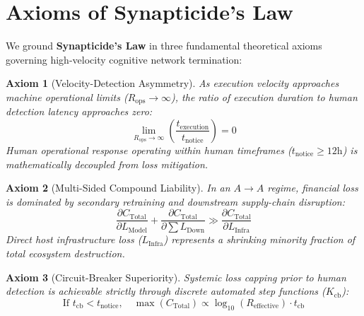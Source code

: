 \section{Axioms of Synapticide's Law}\label{sec:axioms}

We ground \textbf{Synapticide's Law} in three fundamental theoretical axioms governing high-velocity cognitive network termination:

\newtheorem{theorem}{Axiom}

\begin{theorem}[Velocity-Detection Asymmetry]
As execution velocity approaches machine operational limits ($R_{\text{ops}} \to \infty$), the ratio of execution duration to human detection latency approaches zero:
\begin{equation}
\lim_{R_{\text{ops}} \to \infty} \left( \frac{t_{\text{execution}}}{t_{\text{notice}}} \right) = 0
\end{equation}
Human operational response operating within human timeframes ($t_{\text{notice}} \ge 12\text{h}$) is mathematically decoupled from loss mitigation.
\end{theorem}

\begin{theorem}[Multi-Sided Compound Liability]
In an $A \to A$ regime, financial loss is dominated by secondary retraining and downstream supply-chain disruption:
\begin{equation}
\frac{\partial C_{\text{Total}}}{\partial L_{\text{Model}}} + \frac{\partial C_{\text{Total}}}{\partial \sum L_{\text{Down}}} \gg \frac{\partial C_{\text{Total}}}{\partial L_{\text{Infra}}}
\end{equation}
Direct host infrastructure loss ($L_{\text{Infra}}$) represents a shrinking minority fraction of total ecosystem destruction.
\end{theorem}

\begin{theorem}[Circuit-Breaker Superiority]
Systemic loss capping prior to human detection is achievable strictly through discrete automated step functions ($K_{\text{cb}}$):
\begin{equation}
\text{If } t_{\text{cb}} < t_{\text{notice}}, \quad \max(C_{\text{Total}}) \propto \log_{10}(R_{\text{effective}}) \cdot t_{\text{cb}}
\end{equation}
\end{theorem}